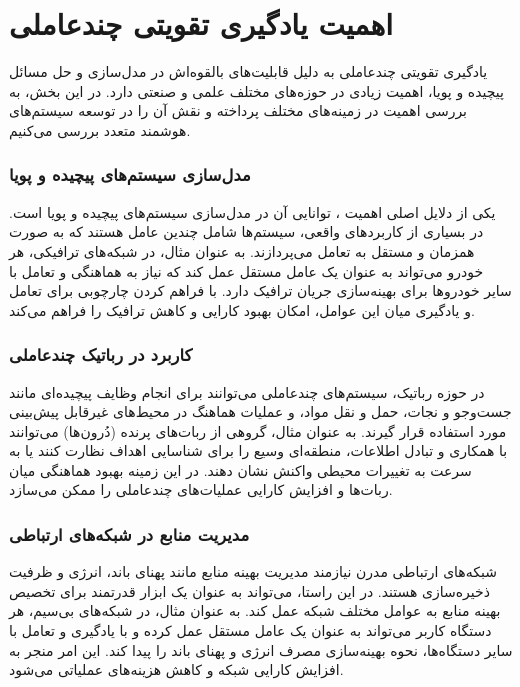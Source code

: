 \section{اهمیت یادگیری تقویتی چندعاملی}

یادگیری تقویتی چندعاملی به دلیل قابلیت‌های بالقوه‌اش در مدل‌سازی و حل مسائل پیچیده و پویا، اهمیت زیادی در حوزه‌های مختلف علمی و صنعتی دارد. در این بخش، به بررسی اهمیت  در زمینه‌های مختلف پرداخته و نقش آن را در توسعه سیستم‌های هوشمند متعدد بررسی می‌کنیم.

\subsubsection{مدل‌سازی سیستم‌های پیچیده و پویا}
یکی از دلایل اصلی اهمیت ، توانایی آن در مدل‌سازی سیستم‌های پیچیده و پویا است. در بسیاری از کاربردهای واقعی، سیستم‌ها شامل چندین عامل هستند که به صورت همزمان و مستقل به تعامل می‌پردازند. به عنوان مثال، در شبکه‌های ترافیکی، هر خودرو می‌تواند به عنوان یک عامل مستقل عمل کند که نیاز به هماهنگی و تعامل با سایر خودروها برای بهینه‌سازی جریان ترافیک دارد.  با فراهم کردن چارچوبی برای تعامل و یادگیری میان این عوامل، امکان بهبود کارایی و کاهش ترافیک را فراهم می‌کند.

\subsubsection{کاربرد در رباتیک چندعاملی}
در حوزه رباتیک، سیستم‌های چندعاملی می‌توانند برای انجام وظایف پیچیده‌ای مانند جست‌وجو و نجات، حمل و نقل مواد، و عملیات هماهنگ در محیط‌های غیرقابل پیش‌بینی مورد استفاده قرار گیرند. به عنوان مثال، گروهی از ربات‌های پرنده (دُرون‌ها) می‌توانند با همکاری و تبادل اطلاعات، منطقه‌ای وسیع را برای شناسایی اهداف نظارت کنند یا به سرعت به تغییرات محیطی واکنش نشان دهند.  در این زمینه بهبود هماهنگی میان ربات‌ها و افزایش کارایی عملیات‌های چندعاملی را ممکن می‌سازد.

\subsubsection{مدیریت منابع در شبکه‌های ارتباطی}
شبکه‌های ارتباطی مدرن نیازمند مدیریت بهینه منابع مانند پهنای باند، انرژی و ظرفیت ذخیره‌سازی هستند. در این راستا،  می‌تواند به عنوان یک ابزار قدرتمند برای تخصیص بهینه منابع به عوامل مختلف شبکه عمل کند. به عنوان مثال، در شبکه‌های بی‌سیم، هر دستگاه کاربر می‌تواند به عنوان یک عامل مستقل عمل کرده و با یادگیری و تعامل با سایر دستگاه‌ها، نحوه بهینه‌سازی مصرف انرژی و پهنای باند را پیدا کند. این امر منجر به افزایش کارایی شبکه و کاهش هزینه‌های عملیاتی می‌شود.

